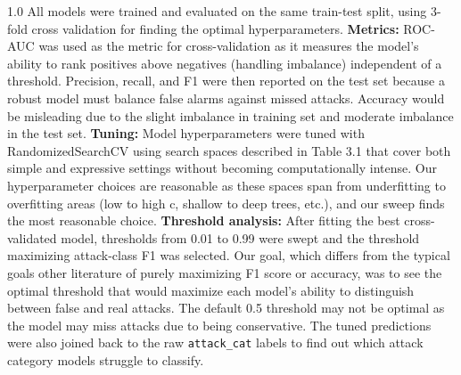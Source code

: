 \begin{spacing}{1.0}
All models were trained and evaluated on the same train-test split, using 3-fold cross validation for finding the optimal hyperparameters. \textbf{Metrics:} ROC-AUC was used as the metric for
cross-validation as it measures the model's ability to rank positives above negatives (handling imbalance) independent of a threshold. Precision, recall, and F1 were then reported on the test set because a robust model must balance false alarms against missed attacks. Accuracy would be misleading due to the slight imbalance in training set and moderate imbalance in the test set. 
\textbf{Tuning:} Model hyperparameters were tuned with RandomizedSearchCV using search
spaces described in Table 3.1 that cover both simple and expressive settings without becoming computationally intense. Our hyperparameter choices are reasonable as these spaces span from underfitting to overfitting areas (low to high c, shallow to deep trees, etc.), and our sweep finds the most reasonable choice. \textbf{Threshold analysis:} After fitting
the best cross-validated model, thresholds from 0.01 to 0.99 were swept and
the threshold maximizing attack-class F1 was selected. Our goal, which differs from the typical goals other literature of purely maximizing F1 score or accuracy, was to see the optimal threshold that would
maximize each model's ability to distinguish between false and real attacks. The default 0.5 threshold may not be optimal as the model may miss attacks due to being conservative. The tuned predictions were also joined back to the
raw \texttt{attack\_cat} labels to find out which attack category models struggle to classify.


\end{spacing}
